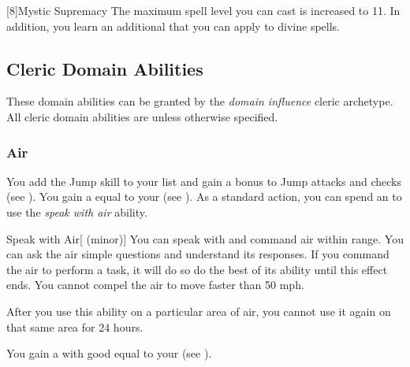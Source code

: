         [8]{Mystic Supremacy}
        The maximum spell level you can cast is increased to 11.
        In addition, you learn an additional  that you can apply to divine spells.

    \subsection{Cleric Domain Abilities}\label{Cleric Domain Abilities}
        These domain abilities can be granted by the \textit{domain influence} cleric archetype.
        All cleric domain abilities are  unless otherwise specified.

        \subsubsection{Air}
             You add the Jump skill to your  list and gain a  bonus to Jump attacks and checks (see ).
             You gain a  equal to your  (see ).
             As a standard action, you can spend an  to use the \textit{speak with air} ability.
            \begin{ability}{Speak with Air}[ (minor)]
                You can speak with and command air within \rnglong range.
                You can ask the air simple questions and understand its responses.
                If you command the air to perform a task, it will do so do the best of its ability until this effect ends.
                You cannot compel the air to move faster than 50 mph.

                After you use this ability on a particular area of air, you cannot use it again on that same area for 24 hours.
            \end{ability}
             You gain a  with good  equal to your  (see ).

